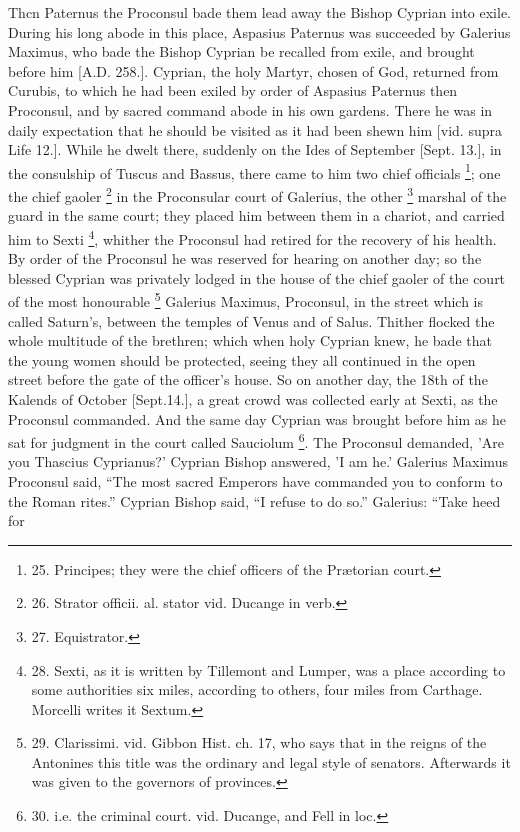 Thcn Paternus the Proconsul
bade them lead away the Bishop Cyprian into exile. During his long
abode in this place, Aspasius Paternus was succeeded by Galerius
Maximus, who bade the Bishop Cyprian be
recalled from exile, and brought before him [A.D.
258.]. Cyprian, the holy Martyr, chosen of God, returned from
Curubis, to which he had been exiled by order of Aspasius Paternus
then Proconsul, and by sacred command abode in his own gardens.
There he was in daily expectation that he should be visited as it had
been shewn him [vid. supra Life 12.]. While he dwelt there, suddenly
on the Ides of September [Sept. 13.], in the consulship of Tuscus and
Bassus, there came to him two chief officials \footnote{25.
Principes; they were the chief officers of the Prætorian court.}; one the chief gaoler \footnote{26.
Strator officii. al. stator vid. Ducange in verb.} in the Proconsular court of Galerius, the other \footnote{27.
Equistrator.} marshal of the guard in the same court; they placed him
between them in a chariot, and carried him to Sexti \footnote{28. Sexti,
as it is written by Tillemont and Lumper, was a place according to
some authorities six miles, according to others, four miles from
Carthage. Morcelli writes it Sextum.}, whither the Proconsul had retired for the recovery of his
health. By order of the Proconsul he was reserved for hearing on
another day; so the blessed Cyprian was privately lodged in the house
of the chief gaoler of the court of the most honourable \footnote{29.
Clarissimi. vid. Gibbon Hist. ch. 17, who says that in the reigns of
the Antonines this title was the ordinary and legal style of senators.
Afterwards it was given to the governors of provinces.} Galerius Maximus, Proconsul, in the street which is called
Saturn's, between the temples of Venus and of Salus. Thither flocked
the whole multitude of the brethren; which when holy Cyprian knew, he
bade that the young women should be protected, seeing they all
continued in the open street before the gate of the officer's house.
So on another day, the 18th of the Kalends of October [Sept.14.], a
great crowd was collected early at Sexti, as the Proconsul commanded.
And the same day Cyprian was brought before him as he sat for judgment
in the court called Sauciolum \footnote{30. i.e.
the criminal court. vid. Ducange, and Fell in loc.}. The Proconsul demanded, 'Are you Thascius Cyprianus?' Cyprian
Bishop answered, 'I am he.' Galerius Maximus Proconsul said, ``The most
sacred Emperors have commanded you to conform to the Roman rites.''
Cyprian Bishop said, ``I refuse to do so.'' Galerius: ``Take heed for
